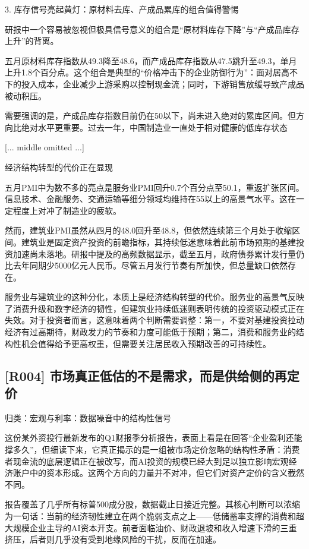 \documentclass[11pt]{ctexart}
\begin{document}
3. 库存信号亮起黄灯：原材料去库、产成品累库的组合值得警惕

研报中一个容易被忽视但极具信号意义的组合是“原材料库存下降”与“产成品库存上升”的背离。

五月原材料库存指数从49.3降至48.6，而产成品库存指数从47.5跳升至49.3，单月上升1.8个百分点。这个组合是典型的“价格冲击下的企业防御行为”：面对居高不下的投入成本，企业减少上游采购以控制现金流；同时，下游销售放缓导致产成品被动积压。

需要强调的是，产成品库存指数目前仍在50以下，尚未进入绝对的累库区间。但方向比绝对水平更重要。过去一年，中国制造业一直处于相对健康的低库存状态

[... middle omitted ...]

经济结构转型的代价正在显现

五月PMI中为数不多的亮点是服务业PMI回升0.7个百分点至50.1，重返扩张区间。信息技术、金融服务、交通运输等细分领域均维持在55以上的高景气水平。这在一定程度上对冲了制造业的疲软。

然而，建筑业PMI虽然从四月的48.0回升至48.8，但依然连续第三个月处于收缩区间。建筑业是固定资产投资的前瞻指标，其持续低迷意味着此前市场预期的基建投资加速尚未落地。研报中提及的高频数据显示，截至五月，政府债券累计发行量仍比去年同期少5000亿元人民币。尽管五月发行节奏有所加快，但总量缺口依然存在。

服务业与建筑业的这种分化，本质上是经济结构转型的代价。服务业的高景气反映了消费升级和数字经济的韧性，但建筑业持续低迷则表明传统的投资驱动模式正在失效。对于投资者而言，这意味着两个判断需要调整：第一，不要对基建投资拉动经济有过高期待，财政发力的节奏和力度可能低于预期；第二，消费和服务业的结构性机会值得给予更高权重，但需要关注居民收入预期改善的可持续性。

\subsection{[R004] 市场真正低估的不是需求，而是供给侧的再定价}
{\small\color{refgray}归类：宏观与利率：数据噪音中的结构性信号}

这份某外资投行最新发布的Q1财报季分析报告，表面上看是在回答“企业盈利还能撑多久”，但细读下来，它真正揭示的是一组被市场定价忽略的结构性矛盾：消费者现金流的底层逻辑正在被改写，而AI投资的规模已经大到足以独立影响宏观经济账户中的资本形成。这两个方向的力量并不对冲，但它们对资产定价的含义截然不同。

报告覆盖了几乎所有标普500成分股，数据截止日接近完整。其核心判断可以浓缩为一句话：当前的经济韧性建立在两个脆弱支点之上——低储蓄率支撑的消费和超大规模企业主导的AI资本开支。前者面临油价、财政退坡和收入增速下滑的三重挤压，后者则几乎没有受到地缘风险的干扰，反而在加速。
\end{document}
